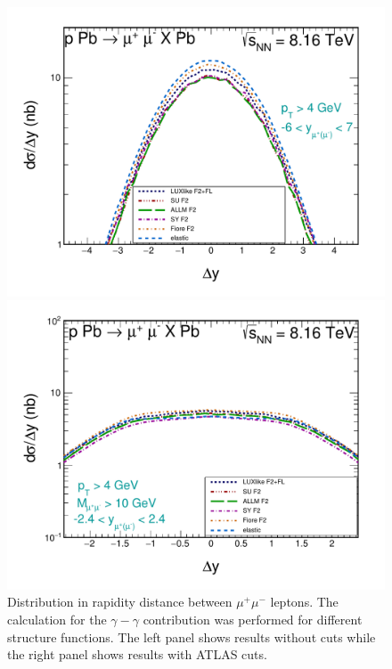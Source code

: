 \begin{figure}[!htbp]
\begin{minipage}{0.47\textwidth}
 \centerline{\includegraphics[width=1.0\textwidth]{figures_Marta/ydiff.pdf}}
\end{minipage}
\begin{minipage}{0.47\textwidth}
 \centerline{\includegraphics[width=1.0\textwidth]{figures_Marta/ydiff-c.pdf}}
\end{minipage}
\caption{
Distribution in rapidity distance between $\mu^+\mu^-$ leptons.
The calculation for the $\gamma-\gamma$ contribution
was performed for different structure functions. 
The left panel shows results  without cuts while the right panel 
shows results with ATLAS cuts.
}
\label{fig:dsig_dy}
\end{figure}

